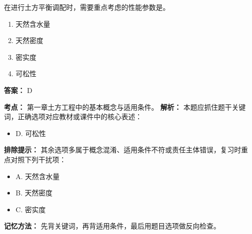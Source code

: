 \documentclass[UTF8,fontset=fandol,11pt]{ctexart}
\begin{document}
\begin{quizbox}[title={第 8 题}]
在进行土方平衡调配时，需要重点考虑的性能参数是。\\
\begin{enumerate}[label=\Alph*.]
\item 天然含水量
\item 天然密度
\item 密实度
\item 可松性
\end{enumerate}
\textbf{答案：} D
\vspace{0.25em}
\begin{answerbox}[title={考点解析}]
\textbf{考点：} 第一章土方工程中的基本概念与适用条件。
\textbf{解析：} 本题应抓住题干关键词，正确选项对应教材或课件中的核心表述：
\begin{itemize}
\item D. 可松性
\end{itemize}
\textbf{排除提示：} 其余选项多属于概念混淆、适用条件不符或责任主体错误，复习时重点对照下列干扰项：
\begin{itemize}
\item A. 天然含水量
\item B. 天然密度
\item C. 密实度
\end{itemize}
\textbf{记忆方法：} 先背关键词，再背适用条件，最后用题目选项做反向检查。
\end{answerbox}
\end{quizbox}

\vspace{0.2em}
\end{document}
